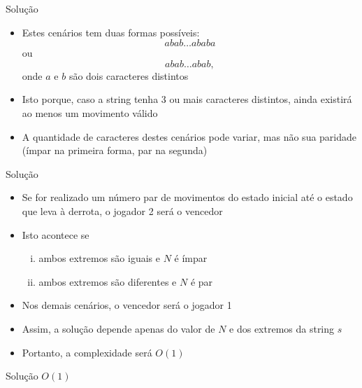 \begin{frame}[fragile]{Solução}

    \begin{itemize}
        \item Estes cenários tem duas formas possíveis:
        \[
            abab\ldots ababa
        \] 
        ou
        \[
            abab\ldots abab,
        \] 
        onde $a$ e $b$ são dois caracteres distintos

        \item Isto porque, caso a string tenha 3 ou mais caracteres distintos, ainda existirá
            ao menos um movimento válido 
            
        \item A quantidade de caracteres destes cenários pode variar, mas não sua paridade
            (ímpar na primeira forma, par na segunda)
    \end{itemize}

\end{frame}

\begin{frame}[fragile]{Solução}

    \begin{itemize}
        \item Se for realizado um número par de movimentos do estado inicial até o estado que
            leva à derrota, o jogador 2 será o vencedor

        \item Isto acontece se 
        \begin{enumerate}[(i)]
            \item ambos extremos são iguais e $N$ é ímpar
            \item ambos extremos são diferentes e $N$ é par
        \end{enumerate}

        \item Nos demais cenários, o vencedor será o jogador 1

        \item Assim, a solução depende apenas do valor de $N$ e dos extremos da string $s$

        \item Portanto, a complexidade será $O(1)$
    \end{itemize}

\end{frame}
\begin{frame}[fragile]{Solução $O(1)$}
\end{frame}
